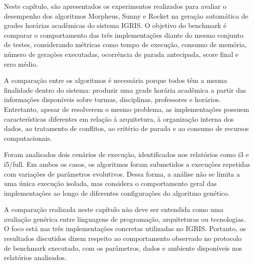 Neste capítulo, são apresentados os experimentos realizados para avaliar o desempenho dos algoritmos Morpheus, Sunny e Rocket na geração automática de grades horárias acadêmicas do sistema IGRIS. O objetivo do benchmark é comparar o comportamento das três implementações diante do mesmo conjunto de testes, considerando métricas como tempo de execução, consumo de memória, número de gerações executadas, ocorrência de parada antecipada, score final e erro médio.

A comparação entre os algoritmos é necessária porque todos têm a mesma finalidade dentro do sistema: produzir uma grade horária acadêmica a partir das informações disponíveis sobre turmas, disciplinas, professores e horários. Entretanto, apesar de resolverem o mesmo problema, as implementações possuem características diferentes em relação à arquitetura, à organização interna dos dados, ao tratamento de conflitos, ao critério de parada e ao consumo de recursos computacionais.

Foram analisados dois cenários de execução, identificados nos relatórios como i3 e i5/full. Em ambos os casos, os algoritmos foram submetidos a execuções repetidas com variações de parâmetros evolutivos. Dessa forma, a análise não se limita a uma única execução isolada, mas considera o comportamento geral das implementações ao longo de diferentes configurações do algoritmo genético.

A comparação realizada neste capítulo não deve ser entendida como uma avaliação genérica entre linguagens de programação, arquiteturas ou tecnologias. O foco está nas três implementações concretas utilizadas no IGRIS. Portanto, os resultados discutidos dizem respeito ao comportamento observado no protocolo de benchmark executado, com os parâmetros, dados e ambiente disponíveis nos relatórios analisados.
